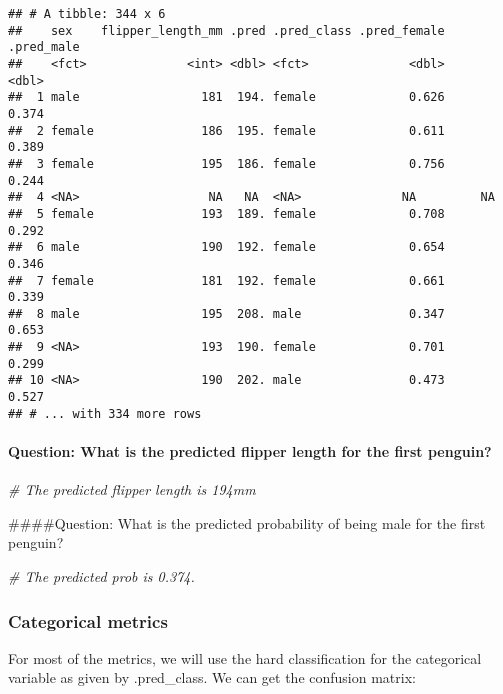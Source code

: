 \documentclass[
]{article}
\newenvironment{Shaded}{\begin{snugshade}}{\end{snugshade}}
\newcommand{\CommentTok}[1]{\textcolor[rgb]{0.56,0.35,0.01}{\textit{#1}}}
\begin{document}
\begin{verbatim}
## # A tibble: 344 x 6
##    sex    flipper_length_mm .pred .pred_class .pred_female .pred_male
##    <fct>              <int> <dbl> <fct>              <dbl>      <dbl>
##  1 male                 181  194. female             0.626      0.374
##  2 female               186  195. female             0.611      0.389
##  3 female               195  186. female             0.756      0.244
##  4 <NA>                  NA   NA  <NA>              NA         NA    
##  5 female               193  189. female             0.708      0.292
##  6 male                 190  192. female             0.654      0.346
##  7 female               181  192. female             0.661      0.339
##  8 male                 195  208. male               0.347      0.653
##  9 <NA>                 193  190. female             0.701      0.299
## 10 <NA>                 190  202. male               0.473      0.527
## # ... with 334 more rows
\end{verbatim}

\hypertarget{question-what-is-the-predicted-flipper-length-for-the-first-penguin}{%
\paragraph{Question: What is the predicted flipper length for the first
penguin?}\label{question-what-is-the-predicted-flipper-length-for-the-first-penguin}}

\begin{Shaded}
\begin{Highlighting}[]
\CommentTok{\# The predicted flipper length is 194mm}
\end{Highlighting}
\end{Shaded}

\#\#\#\#Question: What is the predicted probability of being male for
the first penguin?

\begin{Shaded}
\begin{Highlighting}[]
\CommentTok{\# The predicted prob is 0.374.}
\end{Highlighting}
\end{Shaded}

\hypertarget{categorical-metrics}{%
\subsubsection{Categorical metrics}\label{categorical-metrics}}

For most of the metrics, we will use the hard classification for the
categorical variable as given by .pred\_class. We can get the confusion
matrix:
\end{document}
